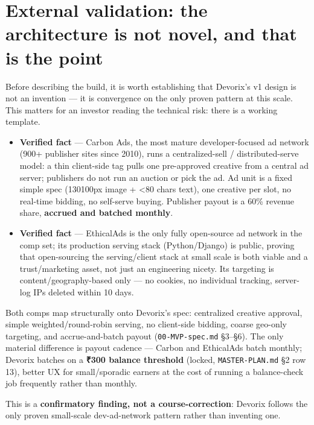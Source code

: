 \section{External validation: the architecture is not novel, and that is the point}
\label{sec:external-validation}

Before describing the build, it is worth establishing that Devorix's v1 design is not an invention --- it is convergence on the only proven pattern at this scale. This matters for an investor reading the technical risk: there is a working template.

\begin{itemize}
  \item \textbf{Verified fact} \citep{carbonads_about_2026} --- Carbon Ads, the most mature developer-focused ad network (900+ publisher sites since 2010), runs a centralized-sell / distributed-serve model: a thin client-side tag pulls one pre-approved creative from a central ad server; publishers do not run an auction or pick the ad. Ad unit is a fixed simple spec (130\texttimes{}100px image + \textless{}80 chars text), one creative per slot, no real-time bidding, no self-serve buying. Publisher payout is a 60\% revenue share, \textbf{accrued and batched monthly}.
  \item \textbf{Verified fact} \citep{ethicalads_pub_2026} --- EthicalAds is the only fully open-source ad network in the comp set; its production serving stack (Python/Django) is public, proving that open-sourcing the serving/client stack at small scale is both viable and a trust/marketing asset, not just an engineering nicety. Its targeting is content/geography-based only --- no cookies, no individual tracking, server-log IPs deleted within 10 days.
\end{itemize}

Both comps map structurally onto Devorix's spec: centralized creative approval, simple weighted/round-robin serving, no client-side bidding, coarse geo-only targeting, and accrue-and-batch payout (\texttt{00-MVP-spec.md} \S3--\S6). The only material difference is payout cadence --- Carbon and EthicalAds batch monthly; Devorix batches on a \textbf{₹300 balance threshold} (locked, \texttt{MASTER-PLAN.md} \S2 row 13), better UX for small/sporadic earners at the cost of running a balance-check job frequently rather than monthly.

This is a \textbf{confirmatory finding, not a course-correction}: Devorix follows the only proven small-scale dev-ad-network pattern rather than inventing one.

